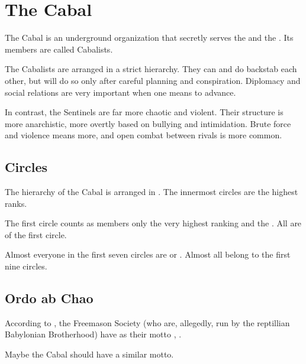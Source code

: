 \section{The Cabal}
\label{The Cabal}
\label{Cabal}
The Cabal is an  underground organization that secretly serves the \resphain{} and the \banes. Its members are called Cabalists.


The Cabalists are arranged in a strict hierarchy. They can and do backstab each other, but will do so only after careful planning and conspiration. Diplomacy and social relations are very important when one means to advance.

In contrast, the Sentinels are far more chaotic and violent. Their structure is more anarchistic, more overtly based on bullying and intimidation. Brute force and violence means more, and open combat between rivals is more common.









\subsection{Circles}
\label{Cabalist circles}
The hierarchy of the Cabal is arranged in . The innermost circles are the highest ranks. 

The first circle counts as members only the very highest ranking \resphain{} and the \banelords. All \satharioth{} are of the first circle. 

Almost everyone in the first seven circles are \resphain{} or \banes. Almost all \resphain{} belong to the first nine circles. 









\subsection{Ordo ab Chao}
According to \DIBiggestSecret, the Freemason Society (who are, allegedly, run by the reptillian Babylonian Brotherhood) have as their motto , .

Maybe the Cabal should have a similar motto. 









